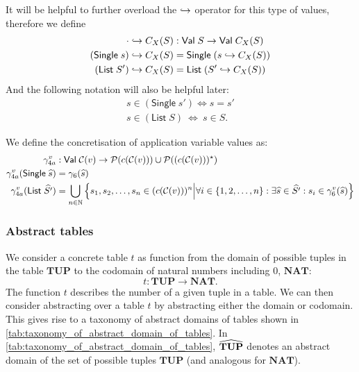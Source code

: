 It will be helpful to further overload the $\hookrightarrow$ operator for this type of values, therefore we define
\begin{align}
    \cdot \hookrightarrow C_X(S) &: \mathsf{Val} \; S \rightarrow \mathsf{Val} \; C_X(S) \\
    (\mathsf{Single} \; s) \hookrightarrow C_X(S) &= \mathsf{Single} \; (s \hookrightarrow C_X(S)) \\
    (\mathsf{List} \; S') \hookrightarrow C_X(S) &= \mathsf{List} \; (S' \hookrightarrow C_X(S))
\end{align}
And the following notation will also be helpful later:
\begin{align}
    s \in (\mathsf{Single} \; s') \iff s = s' \\
    s \in (\mathsf{List} \; S) \ \iff \ s \in S.
\end{align}

We define the concretisation of application variable values as:
\begin{align}
    \gamma^v_{4a} &: \mathsf{Val} \; \mathcal{C}(v) \rightarrow \mathcal{P}(c(\mathcal{C}(v))) \cup\mathcal{P}((c(\mathcal{C}(v)))^\star) \\
    \gamma^v_{4a}(\mathsf{Single} \; \widehat{s}) &= \gamma_6(\widehat{s}) \\
    \gamma^v_{4a}(\mathsf{List} \; \widehat{S'}) &= \bigcup_{n \in \mathbb{N}}\left\{s_1, s_2, \dots, s_n \in (c(\mathcal{C}(v)))^n \middle| \forall i \in \{1, 2, \dots, n\} : \exists \widehat{s} \in \widehat{S'} : s_i \in \gamma^v_6(\widehat{s}) \right\}
\end{align}


\subsubsection{Abstract tables}\label{subsubsec:abstract_domain_of_tables}

We consider a concrete table $t$ as function from the domain of possible tuples in the table $\mathbf{TUP}$ to the codomain of natural numbers including $0$, $\mathbf{NAT}$:
\begin{equation}
    t : \mathbf{TUP} \rightarrow \mathbf{NAT}.
\end{equation}
The function $t$ describes the number of a given tuple in a table.
We can then consider abstracting over a table $t$ by abstracting either the domain or codomain.
This gives rise to a taxonomy of abstract domains of tables shown in \autoref{tab:taxonomy_of_abstract_domain_of_tables}.
In \autoref{tab:taxonomy_of_abstract_domain_of_tables}, $\widehat{\mathbf{TUP}}$ denotes an abstract domain of the set of possible tuples $\mathbf{TUP}$ (and analogous for $\mathbf{NAT}$).



